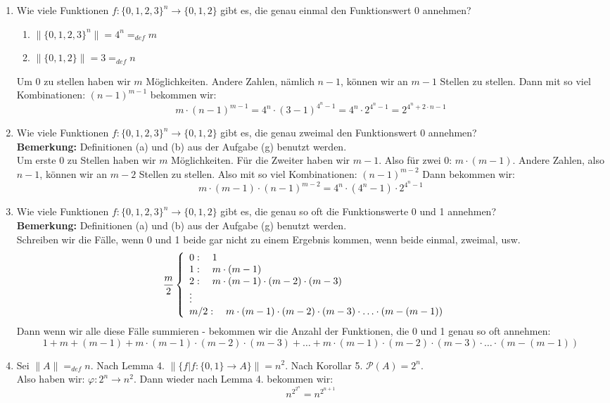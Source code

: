 \begin{enumerate}[label=(\alph*)]
		\item Wie viele Funktionen $f : \{0, 1, 2, 3\}^n \to \{0, 1, 2\}$ gibt es, die genau einmal den Funktionswert 0 annehmen?
		\begin{enumerate}
			\item $\|\{0,1,2,3\}^n\| = 4^n =_{def}m$
			\item $\|\{0,1,2\}\| = 3 =_{def}n$
		\end{enumerate}
		Um 0 zu stellen haben wir $m$ Möglichkeiten. Andere Zahlen, nämlich $n-1$, können wir
		an $m-1$ Stellen zu stellen. Dann mit so viel Kombinationen: $(n-1)^{m-1}$
		bekommen wir: 
		\[m\cdot(n-1)^{m-1} = 4^n\cdot(3-1)^{4^n-1} = 4^n\cdot2^{4^n-1} = 2^{4^n+2\cdot n-1}\]

		\item Wie viele Funktionen $f : \{0, 1, 2, 3\}^n \to \{0, 1, 2\}$ gibt es, die genau zweimal den Funktionswert 0 annehmen? \\
		\textbf{Bemerkung:} Definitionen (a) und (b) aus der Aufgabe (g) benutzt werden. \\
		Um erste 0 zu Stellen haben wir $m$ Möglichkeiten. Für die Zweiter haben wir $m-1$.
		Also für zwei 0: $m\cdot (m-1)$. Andere Zahlen, also $n-1$, können wir
		an $m-2$ Stellen zu stellen. Also mit so viel Kombinationen: $(n-1)^{m-2}$
		Dann bekommen wir:
		\[m\cdot(m-1)\cdot(n-1)^{m-2} = 4^n\cdot(4^n-1)\cdot2^{4^n-1}\] 

		\item Wie viele Funktionen $f : \{0, 1, 2, 3\}^n \to \{0, 1, 2\}$ gibt es, die genau so oft die Funktionswerte 0 und 1 annehmen? \\
		\textbf{Bemerkung:} Definitionen (a) und (b) aus der Aufgabe (g) benutzt werden. \\
		Schreiben wir die Fälle, wenn 0 und 1 beide gar nicht zu einem Ergebnis kommen, wenn beide einmal, zweimal, usw.
		\[ \frac{m}{2} \left\{ 
			\begin{array}{l l}
		   		0: \quad 1  & \\
		    	1: \quad m\cdot(m-1) & \\
		    	2: \quad m\cdot(m-1)\cdot(m-2)\cdot(m-3) & \\
		    		\vdots \\
		    	m/2: \quad m\cdot(m-1)\cdot(m-2)\cdot(m-3)\cdot \ldots \cdot(m-(m-1))& 
		  	\end{array} 
		\right.\]
		Dann wenn wir alle diese Fälle summieren - bekommen wir die Anzahl der Funktionen, die 0 und 1 genau so oft annehmen:
		\[1 + m+(m-1) + m\cdot(m-1)\cdot(m-2)\cdot (m-3)+ \ldots + m\cdot(m-1)\cdot(m-2)\cdot(m-3)\cdot \ldots \cdot(m-(m-1))\]

		\item Sei $\|A\|=_{def} n$. Nach Lemma 4. $\|\{ f|f:\{0,1\} \to A \}\| = n^2$. 
		Nach Korollar 5. $\mathcal{P}(A) = 2^n$. \\ Also haben wir: $\varphi : 2^n \to n^2$. Dann wieder nach Lemma 4. bekommen wir: \[n^{2^{2^n}} = n^{2^{n+1}}\]
	\end{enumerate} 
	
